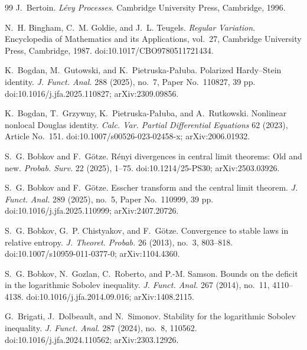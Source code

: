 \begin{thebibliography}{99}
J.~Bertoin.
\newblock \emph{L{\'e}vy Processes}.
\newblock Cambridge University Press, Cambridge, 1996.

N.~H. Bingham, C.~M. Goldie, and J.~L. Teugels.
\newblock \emph{Regular Variation}.
\newblock Encyclopedia of Mathematics and its Applications, vol.~27,
Cambridge University Press, Cambridge, 1987.
\newblock doi:10.1017/CBO9780511721434.

K.~Bogdan, M.~Gutowski, and K.~Pietruska-Pa{\l}uba.
\newblock Polarized Hardy--Stein identity.
\newblock \emph{J. Funct. Anal.} 288 (2025), no.~7, Paper No.~110827,
39 pp.
\newblock doi:10.1016/j.jfa.2025.110827; arXiv:2309.09856.

K.~Bogdan, T.~Grzywny, K.~Pietruska-Pa{\l}uba, and A.~Rutkowski.
\newblock Nonlinear nonlocal Douglas identity.
\newblock \emph{Calc. Var. Partial Differential Equations} 62 (2023),
Article No.~151.
\newblock doi:10.1007/s00526-023-02458-x; arXiv:2006.01932.

S.~G. Bobkov and F.~G\"otze.
\newblock R\'enyi divergences in central limit theorems: Old and new.
\newblock \emph{Probab. Surv.} 22 (2025), 1--75.
\newblock doi:10.1214/25-PS30; arXiv:2503.03926.

S.~G. Bobkov and F.~G\"otze.
\newblock Esscher transform and the central limit theorem.
\newblock \emph{J. Funct. Anal.} 289 (2025), no.~5, Paper No.~110999,
39 pp.
\newblock doi:10.1016/j.jfa.2025.110999; arXiv:2407.20726.

S.~G. Bobkov, G.~P. Chistyakov, and F.~G\"otze.
\newblock Convergence to stable laws in relative entropy.
\newblock \emph{J. Theoret. Probab.} 26 (2013), no.~3, 803--818.
\newblock doi:10.1007/s10959-011-0377-0; arXiv:1104.4360.

S.~G. Bobkov, N.~Gozlan, C.~Roberto, and P.-M. Samson.
\newblock Bounds on the deficit in the logarithmic Sobolev inequality.
\newblock \emph{J. Funct. Anal.} 267 (2014), no.~11, 4110--4138.
\newblock doi:10.1016/j.jfa.2014.09.016; arXiv:1408.2115.

G.~Brigati, J.~Dolbeault, and N.~Simonov.
\newblock Stability for the logarithmic Sobolev inequality.
\newblock \emph{J. Funct. Anal.} 287 (2024), no.~8, 110562.
\newblock doi:10.1016/j.jfa.2024.110562; arXiv:2303.12926.


\end{thebibliography}
